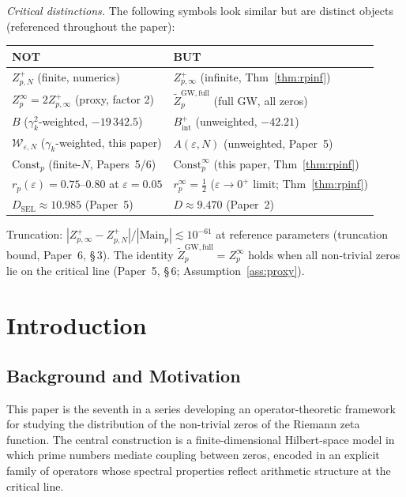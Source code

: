 \documentclass[11pt]{article}
\begin{document}
\medskip
\emph{Critical distinctions.}
The following symbols look similar but are distinct objects
(referenced throughout the paper):
\begin{center}
\renewcommand{\arraystretch}{1.25}
\begin{tabular}{l|l}
\hline
\textbf{NOT} & \textbf{BUT} \\
\hline
$Z_{p,N}^+$ (finite, numerics) & $Z_{p,\infty}^+$ (infinite, Thm~\ref{thm:rpinf}) \\
$Z_p^\infty=2Z_{p,\infty}^+$ (proxy, factor 2) & $\widetilde Z_p^{\mathrm{GW,full}}$ (full GW, all zeros) \\
$B$ ($\gamma_k^2$-weighted, $-19\,342.5$) & $B_{\mathrm{int}}^+$ (unweighted, $-42.21$) \\
$\mathcal{W}_{\varepsilon,N}$ ($\gamma_k$-weighted, this paper) & $A(\varepsilon,N)$ (unweighted, Paper~5) \\
$\mathrm{Const}_p$ (finite-$N$, Papers~5/6) & $\mathrm{Const}_p^\infty$ (this paper, Thm~\ref{thm:rpinf}) \\
$r_p(\varepsilon)=0.75$--$0.80$ at $\varepsilon=0.05$ & $r_p^\infty=\tfrac12$ ($\varepsilon\to 0^+$ limit; Thm~\ref{thm:rpinf}) \\
$D_{\mathrm{SEL}}\approx 10.985$ (Paper~5) & $D\approx 9.470$ (Paper~2) \\
\hline
\end{tabular}
\end{center}
Truncation: $|Z_{p,\infty}^+-Z_{p,N}^+|/|\mathrm{Main}_p|
\lesssim 10^{-61}$ at reference parameters
(truncation bound, Paper~6, \S\,3).
The identity $\widetilde Z_p^{\mathrm{GW,full}}=Z_p^\infty$ holds when all
non-trivial zeros lie on the critical line
(Paper~5, \S\,6; Assumption~\ref{ass:proxy}).

\vspace{2em}
\newpage

\section{Introduction}
\label{sec:intro}

\subsection{Background and Motivation}

This paper is the seventh in a series developing an operator-theoretic
framework for studying the distribution of the non-trivial zeros of
the Riemann zeta function.
The central construction is a finite-dimensional Hilbert-space model
in which prime numbers mediate coupling between zeros, encoded in an
explicit family of operators whose spectral properties reflect
arithmetic structure at the critical line.
\end{document}
